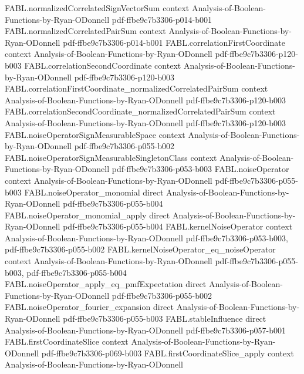 \begin{theorem}
\proofstep
  {FABL.normalizedCorrelatedSignVectorSum}
  {context}
  {Analysis-of-Boolean-Functions-by-Ryan-ODonnell}
  {pdf-ffbe9c7b3306-p014-b001}
\proofstep
  {FABL.normalizedCorrelatedPairSum}
  {context}
  {Analysis-of-Boolean-Functions-by-Ryan-ODonnell}
  {pdf-ffbe9c7b3306-p014-b001}
\proofstep
  {FABL.correlationFirstCoordinate}
  {context}
  {Analysis-of-Boolean-Functions-by-Ryan-ODonnell}
  {pdf-ffbe9c7b3306-p120-b003}
\proofstep
  {FABL.correlationSecondCoordinate}
  {context}
  {Analysis-of-Boolean-Functions-by-Ryan-ODonnell}
  {pdf-ffbe9c7b3306-p120-b003}
\proofstep
  {FABL.correlationFirstCoordinate_normalizedCorrelatedPairSum}
  {context}
  {Analysis-of-Boolean-Functions-by-Ryan-ODonnell}
  {pdf-ffbe9c7b3306-p120-b003}
\proofstep
  {FABL.correlationSecondCoordinate_normalizedCorrelatedPairSum}
  {context}
  {Analysis-of-Boolean-Functions-by-Ryan-ODonnell}
  {pdf-ffbe9c7b3306-p120-b003}
\proofstep
  {FABL.noiseOperatorSignMeasurableSpace}
  {context}
  {Analysis-of-Boolean-Functions-by-Ryan-ODonnell}
  {pdf-ffbe9c7b3306-p055-b002}
\proofstep
  {FABL.noiseOperatorSignMeasurableSingletonClass}
  {context}
  {Analysis-of-Boolean-Functions-by-Ryan-ODonnell}
  {pdf-ffbe9c7b3306-p053-b003}
\proofstep
  {FABL.noiseOperator}
  {context}
  {Analysis-of-Boolean-Functions-by-Ryan-ODonnell}
  {pdf-ffbe9c7b3306-p055-b003}
\proofstep
  {FABL.noiseOperator_monomial}
  {direct}
  {Analysis-of-Boolean-Functions-by-Ryan-ODonnell}
  {pdf-ffbe9c7b3306-p055-b004}
\proofstep
  {FABL.noiseOperator_monomial_apply}
  {direct}
  {Analysis-of-Boolean-Functions-by-Ryan-ODonnell}
  {pdf-ffbe9c7b3306-p055-b004}
\proofstep
  {FABL.kernelNoiseOperator}
  {context}
  {Analysis-of-Boolean-Functions-by-Ryan-ODonnell}
  {pdf-ffbe9c7b3306-p053-b003,
    pdf-ffbe9c7b3306-p055-b002}
\proofstep
  {FABL.kernelNoiseOperator_eq_noiseOperator}
  {context}
  {Analysis-of-Boolean-Functions-by-Ryan-ODonnell}
  {pdf-ffbe9c7b3306-p055-b003,
    pdf-ffbe9c7b3306-p055-b004}
\proofstep
  {FABL.noiseOperator_apply_eq_pmfExpectation}
  {direct}
  {Analysis-of-Boolean-Functions-by-Ryan-ODonnell}
  {pdf-ffbe9c7b3306-p055-b002}
\proofstep
  {FABL.noiseOperator_fourier_expansion}
  {direct}
  {Analysis-of-Boolean-Functions-by-Ryan-ODonnell}
  {pdf-ffbe9c7b3306-p055-b003}
\proofstep
  {FABL.stableInfluence}
  {direct}
  {Analysis-of-Boolean-Functions-by-Ryan-ODonnell}
  {pdf-ffbe9c7b3306-p057-b001}
\proofstep
  {FABL.firstCoordinateSlice}
  {context}
  {Analysis-of-Boolean-Functions-by-Ryan-ODonnell}
  {pdf-ffbe9c7b3306-p069-b003}
\proofstep
  {FABL.firstCoordinateSlice_apply}
  {context}
  {Analysis-of-Boolean-Functions-by-Ryan-ODonnell}

\end{theorem}
